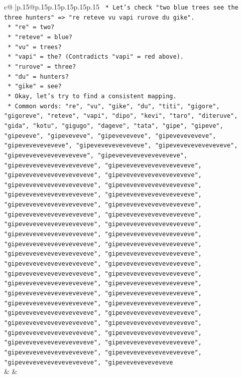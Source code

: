 \documentclass{article}
\begin{document}
{\begin{supertabular}{c@{$\;$}|p{.15\linewidth}@{}p{.15\linewidth}p{.15\linewidth}p{.15\linewidth}p{.15\linewidth}p{.15\linewidth}}
{{{\texttt{                    *   Let's check "two blue trees see the three hunters" => "re reteve vu vapi rurove du gike".} \\
\texttt{                        *   "re" = two?} \\
\texttt{                        *   "reteve" = blue?} \\
\texttt{                        *   "vu" = trees?} \\
\texttt{                        *   "vapi" = the? (Contradicts "vapi" = red above).} \\
\texttt{                        *   "rurove" = three?} \\
\texttt{                        *   "du" = hunters?} \\
\texttt{                        *   "gike" = see?} \\
\texttt{                    *   Okay, let's try to find a consistent mapping.} \\
\texttt{                    *   Common words: "re", "vu", "gike", "du", "titi", "gigore", "gigoreve", "reteve", "vapi", "dipo", "kevi", "taro", "diteruve", "gida", "kotu", "gigugo", "dageve", "tata", "gipe", "gipeve", "gipeveve", "gipeveveve", "gipeveveveve", "gipeveveveveve", "gipeveveveveveve", "gipeveveveveveveve", "gipeveveveveveveveve", "gipeveveveveveveveveve", "gipeveveveveveveveveve", "gipeveveveveveveveveveve", "gipeveveveveveveveveveve", "gipeveveveveveveveveveve", "gipeveveveveveveveveveve", "gipeveveveveveveveveveve", "gipeveveveveveveveveveve", "gipeveveveveveveveveveve", "gipeveveveveveveveveveve", "gipeveveveveveveveveveve", "gipeveveveveveveveveveve", "gipeveveveveveveveveveve", "gipeveveveveveveveveveve", "gipeveveveveveveveveveve", "gipeveveveveveveveveveve", "gipeveveveveveveveveveve", "gipeveveveveveveveveveve", "gipeveveveveveveveveveve", "gipeveveveveveveveveveve", "gipeveveveveveveveveveve", "gipeveveveveveveveveveve", "gipeveveveveveveveveveve", "gipeveveveveveveveveveve", "gipeveveveveveveveveveve", "gipeveveveveveveveveveve", "gipeveveveveveveveveveve", "gipeveveveveveveveveveve", "gipeveveveveveveveveveve", "gipeveveveveveveveveveve", "gipeveveveveveveveveveve", "gipeveveveveveveveveveve", "gipeveveveveveveveveveve", "gipeveveveveveveveveveve", "gipeveveveveveveveveveve", "gipeveveveveveveveveveve", "gipeveveveveveveveveveve", "gipeveveveveveveveveveve", "gipeveveveveveveveveveve", "gipeveveveveveveveveveve", "gipeveveveveveveveveveve", "gipeveveveveveveveveveve", "gipeveveveveveveveveveve", "gipeveveveveveveve} \\
            }
        }
    }
    & & \\ \\


\end{supertabular}}
\end{document}
